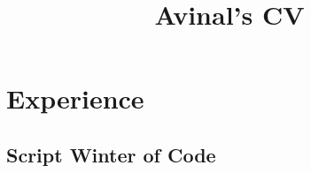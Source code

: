 \documentclass[a4paper]{comcv}
\title{Avinal's CV}
\begin{document}
    \section{Experience}
    \subsection{Script Winter of Code}
    
\end{document}
